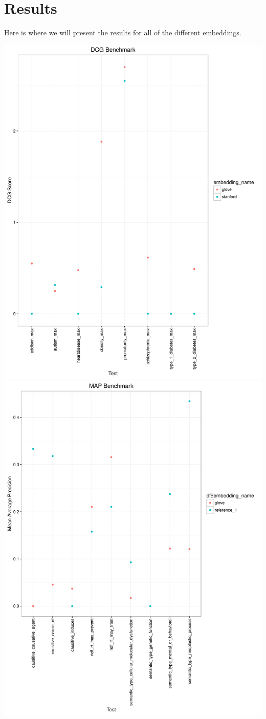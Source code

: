 \documentclass{ws-procs11x85}
\begin{document}
\section{Results}
Here is where we will present the results for all of the different embeddings.

\includegraphics[scale=.5]{dcg_plot.pdf}
\includegraphics[scale=.5]{map_plot.pdf}



\end{document}
